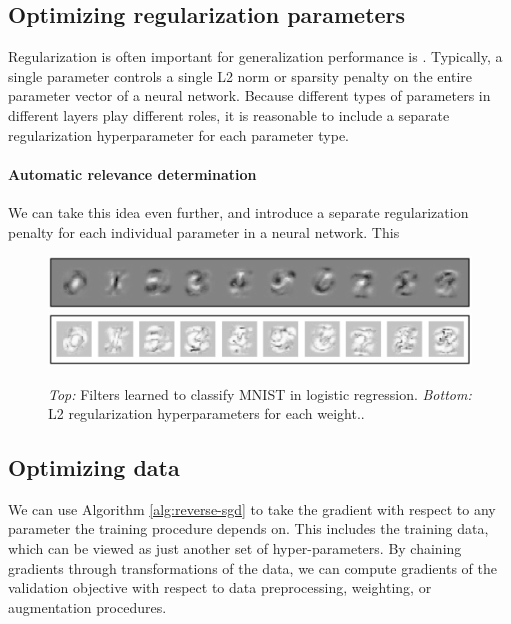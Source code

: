 \documentclass{article}
\begin{document}
\subsection{Optimizing regularization parameters}

Regularization is often important for generalization performance is .
Typically, a single parameter controls a single L2 norm or sparsity penalty on the entire parameter vector of a neural network.
Because different types of parameters in different layers play different roles, it is reasonable to include a separate regularization hyperparameter for each parameter type.

\paragraph{Automatic relevance determination}
We can take this idea even further, and introduce a separate regularization penalty for each individual parameter in a neural network.
This

\begin{figure}[h!]
\begin{center}
\includegraphics[width=\columnwidth]{../experiments/Jan_21_nn_ard/2/weights.pdf}
\includegraphics[width=\columnwidth]{../experiments/Jan_21_nn_ard/2/penalties.pdf}
\caption{\emph{Top:} Filters learned to classify MNIST in logistic regression.
\emph{Bottom:} L2 regularization hyperparameters for each weight..}
\label{fig:logistic ard}
\end{center}
\end{figure} 


\subsection{Optimizing data}

We can use Algorithm \ref{alg:reverse-sgd} to take the gradient with respect to any parameter the training procedure depends on.
This includes the training data, which can be viewed as just another set of hyper-parameters.
By chaining gradients through transformations of the data, we can compute gradients of the validation objective with respect to data preprocessing, weighting, or augmentation procedures.
\end{document}
